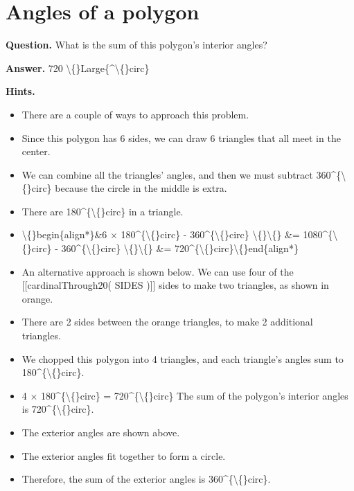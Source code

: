 \documentclass{article}
\begin{document}
\section*{Angles of a polygon}
\textbf{Question.} What is the sum of this polygon's interior angles?

\textbf{Answer.} 720 \textbackslash\{\}Large\{\textasciicircum{}\textbackslash\{\}circ\}

\textbf{Hints.}
\begin{itemize}
  \item There are a couple of ways to approach this problem.
  \item Since this polygon has 6 sides,
                        we can draw 6 triangles that all meet in the center.
  \item We can combine all the triangles' angles, and then we must subtract 360\textasciicircum{}\{\textbackslash\{\}circ\} because the circle in the middle is extra.
  \item There are 180\textasciicircum{}\{\textbackslash\{\}circ\} in a triangle.
  \item \textbackslash\{\}begin\{align*\}\&6 $\times$ 180\textasciicircum{}\{\textbackslash\{\}circ\} - 360\textasciicircum{}\{\textbackslash\{\}circ\} \textbackslash\{\}\textbackslash\{\}
                    \&= 1080\textasciicircum{}\{\textbackslash\{\}circ\} - 360\textasciicircum{}\{\textbackslash\{\}circ\} \textbackslash\{\}\textbackslash\{\}
                    \&= 720\textasciicircum{}\{\textbackslash\{\}circ\}\textbackslash\{\}end\{align*\}
  \item An alternative approach is shown below.
                    We can use four of the [[cardinalThrough20( SIDES )]] sides to make two triangles, as shown in orange.
  \item There are 2 sides between the orange triangles,
                    to make 2 additional triangles.
  \item We chopped this polygon into 4 triangles,
                    and each triangle's angles sum to 180\textasciicircum{}\{\textbackslash\{\}circ\}.
  \item 4 $\times$ 180\textasciicircum{}\{\textbackslash\{\}circ\} = 720\textasciicircum{}\{\textbackslash\{\}circ\}
                    The sum of the polygon's interior angles is 720\textasciicircum{}\{\textbackslash\{\}circ\}.
  \item The exterior angles are shown above.
  \item The exterior angles fit together to form a circle.
  \item Therefore, the sum of the exterior angles is 360\textasciicircum{}\{\textbackslash\{\}circ\}.
\end{itemize}
\end{document}
